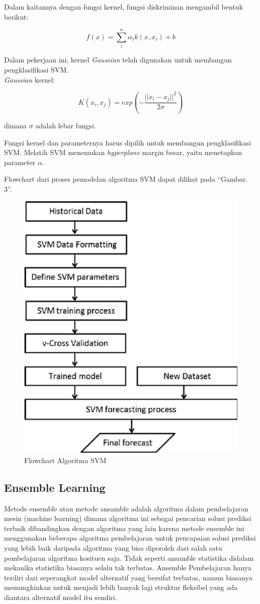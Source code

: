 \documentclass[conference]{IEEEtran}
\begin{document}
Dalam kaitannya dengan fungsi kernel, fungsi diskriminan mengambil bentuk berikut:

\begin{equation*}
f(x) = \sum^{n}_i \alpha_ik(x,x_i)+b
\label{eq4}
\end{equation*}

Dalam pekerjaan ini, kernel \emph{Gaussian} telah digunakan
untuk membangun pengklasifikasi SVM.\\ \emph{Gaussian} kernel:

\begin{equation*}
K(x_i,x_j) = exp\left (- \frac{||x_i-x_j||^2}{2\sigma} \right )
\label{eq5}
\end{equation*}

\noindent dimana $\sigma$ adalah lebar fungsi.

Fungsi kernel dan parameternya harus dipilih untuk membangun pengklasifikasi SVM. Melatih SVM menemukan \emph{hyperplane} margin besar, yaitu menetapkan parameter $\alpha$.

Flowchart dari proses pemodelan algoritma SVM dapat dilihat pada ``Gambar. 3''\cite{inproceedings}.\vspace{6pt}

\begin{figure}
\centering
\includegraphics[width=.4\textwidth]{Gambar/gambarsvm.jpg}
\caption{Flowchart Algoritma SVM}
\end{figure}

\subsection{Ensemble Learning}

Metode ensemble atau metode ansamble adalah algoritma dalam pembelajaran mesin (machine learning) dimana algoritma ini sebagai pencarian solusi prediksi terbaik dibandingkan dengan algoritma yang lain karena metode ensemble ini menggunakan beberapa algoritma pembelajaran untuk pencapaian solusi prediksi yang lebih baik daripada algoritma yang bisa diperoleh dari salah satu pembelajaran algoritma kosituen saja. Tidak seperti ansamble statistika didalam mekanika statistika biasanya selalu tak terbatas. Ansemble Pembelajaran hanya terdiri dari seperangkat model alternatif yang bersifat terbatas, namun biasanya memungkinkan untuk menjadi lebih banyak lagi struktur fleksibel yang ada diantara alternatif model itu sendiri.
\end{document}
